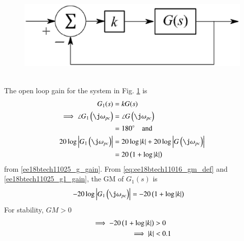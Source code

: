 \begin{enumerate}[label=\thesubsection.\arabic*.,ref=\thesubsection.\theenumi]
\begin{figure}[h]
    \includegraphics[width=\columnwidth]{./figs/ee18btech11025/q42.eps}
    \caption{}
    \label{fig:ee18btech11025_bock}
\end{figure}
\\
\solution The open loop gain for the system in    Fig.  \ref{fig:ee18btech11025_bock} is
%
    \begin{align}  
            G_1(s) &= kG(s)
\\
\implies \angle G_1\brak{\j\omega_{pc}}  &= \angle G\brak{\j\omega_{pc}}  
\\
&= 180 \degree \quad \text{and}
\\
 20\log\abs{ G_1\brak{\j\omega_{pc}}}  &= 20\log \abs{k }+20\log\abs{ G\brak{\j\omega_{pc}}}
\\
&= 20 \brak{1 + \log \abs{k }}
\label{ee18btech11025_g1_gain}
    \end{align}
from \eqref{ee18btech11025_g_gain}.  From \eqref{eq:ee18btech11016_gm_def} and \eqref{ee18btech11025_g1_gain}, the GM of $G_1(s)$ is
    \begin{align}  
-20\log \abs{ G_1\brak{\j\omega_{pc}}} &= -20 \brak{1 + \log \abs{k }}
    \end{align}
%
For stability, $GM > 0$
    \begin{align}  
\implies  -20 \left(1 + \log \left\vert k \right\vert\right) &> 0
\\
\implies  \left\vert k\right\vert &< 0.1
    \end{align}
%
\end{enumerate}

